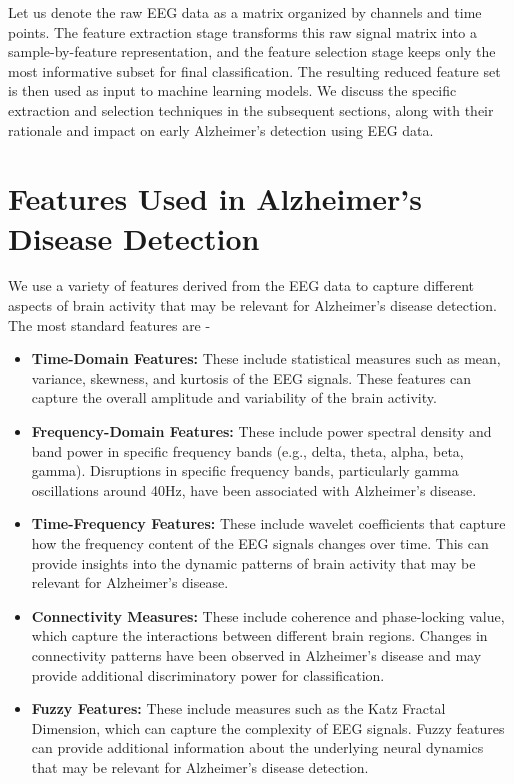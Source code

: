 \documentclass[openany]{book}
\begin{document}
Let us denote the raw EEG data as a matrix organized by channels and time points. The feature extraction stage transforms this raw signal matrix into a sample-by-feature representation, and the feature selection stage keeps only the most informative subset for final classification. The resulting reduced feature set is then used as input to machine learning models. We discuss the specific extraction and selection techniques in the subsequent sections, along with their rationale and impact on early Alzheimer's detection using EEG data.
\section{Features Used in Alzheimer's Disease Detection}
We use a variety of features derived from the EEG data to capture different aspects of brain activity that may be relevant for Alzheimer's disease detection. The most standard features are - 
\begin{itemize}
    \item \textbf{Time-Domain Features:} These include statistical measures such as mean, variance, skewness, and kurtosis of the EEG signals. These features can capture the overall amplitude and variability of the brain activity.
    \item \textbf{Frequency-Domain Features:} These include power spectral density and band power in specific frequency bands (e.g., delta, theta, alpha, beta, gamma). Disruptions in specific frequency bands, particularly gamma oscillations around 40Hz, have been associated with Alzheimer's disease.
    \item \textbf{Time-Frequency Features:} These include wavelet coefficients that capture how the frequency content of the EEG signals changes over time. This can provide insights into the dynamic patterns of brain activity that may be relevant for Alzheimer's disease.
    \item \textbf{Connectivity Measures:} These include coherence and phase-locking value, which capture the interactions between different brain regions. Changes in connectivity patterns have been observed in Alzheimer's disease and may provide additional discriminatory power for classification.
    \item \textbf{Fuzzy Features:} These include measures such as the Katz Fractal Dimension, which can capture the complexity of EEG signals. Fuzzy features can provide additional information about the underlying neural dynamics that may be relevant for Alzheimer's disease detection.
\end{itemize}
\end{document}
